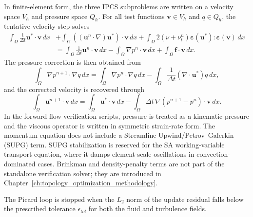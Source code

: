 In finite-element form, the three IPCS subproblems are written on a velocity space $V_h$ and pressure space $Q_h$. For all test functions $\mathbf{v}\in V_h$ and $q\in Q_h$, the tentative velocity step solves
\begin{equation}
	\begin{aligned}
		\int_\Omega \frac{1}{\Delta t}\mathbf{u}^*\cdot\mathbf{v}\,dx
		&+ \int_\Omega ((\mathbf{u}^n\cdot\nabla)\mathbf{u}^*)\cdot\mathbf{v}\,dx
		+ \int_\Omega 2(\nu+\nu_t^n)\boldsymbol{\varepsilon}(\mathbf{u}^*):\boldsymbol{\varepsilon}(\mathbf{v})\,dx \\
		&=
			\int_\Omega \frac{1}{\Delta t}\mathbf{u}^n\cdot\mathbf{v}\,dx
			-\int_\Omega \nabla p^n\cdot\mathbf{v}\,dx
			+\int_\Omega \mathbf{f}\cdot\mathbf{v}\,dx .
	\end{aligned}
	\label{eq:ipcs_tentative_weak}
\end{equation}
The pressure correction is then obtained from
\begin{equation}
	\int_\Omega \nabla p^{n+1}\cdot\nabla q\,dx
	=
	\int_\Omega \nabla p^n\cdot\nabla q\,dx
	-\int_\Omega \frac{1}{\Delta t}(\nabla\cdot\mathbf{u}^*)q\,dx ,
	\label{eq:ipcs_pressure_weak}
\end{equation}
and the corrected velocity is recovered through
\begin{equation}
	\int_\Omega \mathbf{u}^{n+1}\cdot\mathbf{v}\,dx
	=
	\int_\Omega \mathbf{u}^*\cdot\mathbf{v}\,dx
	-\int_\Omega \Delta t\,\nabla(p^{n+1}-p^n)\cdot\mathbf{v}\,dx .
	\label{eq:ipcs_velocity_update_weak}
\end{equation}
In the forward-flow verification scripts, pressure is treated as a kinematic pressure and the viscous operator is written in symmetric strain-rate form. The momentum equation does not include a Streamline-Upwind/Petrov--Galerkin (SUPG) term. SUPG stabilization \cite{Brooks1982} is reserved for the SA working-variable transport equation, where it damps element-scale oscillations in convection-dominated cases. Brinkman and density-penalty terms are not part of the standalone verification solver; they are introduced in Chapter~\ref{ch:topology_optimization_methodology}.

The Picard loop is stopped when the $L_2$ norm of the update residual falls below the prescribed tolerance $\epsilon_{tol}$ for both the fluid and turbulence fields.


